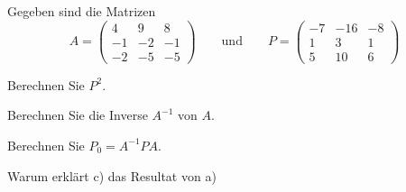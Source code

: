Gegeben sind die Matrizen
\[
A
=
\begin{pmatrix}
 4& 9& 8\\
-1&-2&-1\\
-2&-5&-5
\end{pmatrix}
\qquad\text{und}\qquad
P
=
\begin{pmatrix}
-7&-16&-8\\
 1&  3& 1\\
 5& 10& 6
\end{pmatrix}
\]
\begin{teilaufgaben}
\item Berechnen Sie $P^2$.
\item Berechnen Sie die Inverse $A^{-1}$ von $A$.
\item Berechnen Sie $P_0=A^{-1}PA$.
\item Warum erklärt c) das Resultat von a)
\end{teilaufgaben}

